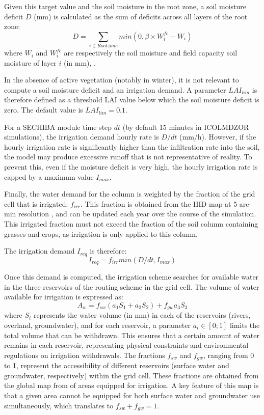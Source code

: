 Given this target value and the soil moisture in the root zone, a soil moisture deficit $D$ (mm) is calculated as the sum of deficits across all layers of the root zone:
\begin{equation}
    D = \sum_{i \in Rootzone} min(0,\beta \times W_i^{fc} - W_i)
\end{equation}
where $W_i$ and $W_i^{fc}$ are respectively the soil moisture and field capacity soil moisture of layer $i$ (in mm), .

In the absence of active vegetation (notably in winter), it is not relevant to compute a soil moisture deficit and an irrigation demand. A parameter $LAI_{lim}$ is therefore defined as a threshold LAI value below which the soil moisture deficit is zero. The default value is $LAI_{lim}=0.1$.

For a SECHIBA module time step $dt$ (by default 15 minutes in ICOLMDZOR simulations), the irrigation demand hourly rate is $D/dt$ (mm/h). However, if the hourly irrigation rate is significantly higher than the infiltration rate into the soil, the model may produce excessive runoff that is not representative of reality. To prevent this, even if the moisture deficit is very high, the hourly irrigation rate is capped by a maximum value $I_{max}$.

Finally, the water demand for the column is weighted by the fraction of the grid cell that is irrigated: $f_{irr}$. This fraction is obtained from the HID map at 5 arc-min resolution \citep{siebert_quantifying_2010}, and can be updated each year over the course of the simulation.
This irrigated fraction must not exceed the fraction of the soil column containing grasses and crops, as irrigation is only applied to this column.

The irrigation demand $I_{req}$ is therefore:
\begin{equation}
    I_{req} = f_{irr} min(D/dt, I_{max})
\end{equation}

Once this demand is computed, the irrigation scheme searches for available water in the three reservoirs of the routing scheme in the grid cell.
The volume of water available for irrigation is expressed as:
\begin{equation}
    A_w = f_{sw} (a_1 S_1 + a_2 S_2)+ f_{gw}a_3 S_3
\end{equation}
where $S_i$ represents the water volume (in mm) in each of the reservoirs (rivers, overland, groundwater), and for each reservoir, a parameter $a_i \in [0;1]$ limits the total volume that can be withdrawn. This ensures that a certain amount of water remains in each reservoir, representing physical constraints and environmental regulations on irrigation withdrawals.
The fractions $f_{sw}$ and $f_{gw}$, ranging from 0 to 1, represent the accessibility of different reservoirs (surface water and groundwater, respectively) within the grid cell. These fractions are obtained from the global map from \citet{siebert_groundwater_2010} of areas equipped for irrigation. A key feature of this map is that a given area cannot be equipped for both surface water and groundwater use simultaneously, which translates to $f_{sw} + f_{gw} =1$.

